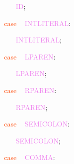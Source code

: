 \documentclass[8, usernames, dvipsnames]{beamer}
\begin{document}
\begin{frame}
\textcolor{White}{\   }
\textcolor{White}{\   }
\textcolor{White}{\   }
\textcolor{OrangeRed}{	}
\textcolor{White}{\ }
\textcolor{Violet}{ID}\textcolor{Sepia}{;}

 \textcolor{White}{\   }
\textcolor{White}{\   }
\textcolor{OrangeRed}{case}
\textcolor{White}{\ }
\textcolor{Violet}{INTLITERAL}\textcolor{Sepia}{:}

 \textcolor{White}{\   }
\textcolor{White}{\   }
\textcolor{White}{\   }
\textcolor{OrangeRed}{	}
\textcolor{White}{\ }
\textcolor{Violet}{INTLITERAL}\textcolor{Sepia}{;}

 \textcolor{White}{\   }
\textcolor{White}{\   }
\textcolor{OrangeRed}{case}
\textcolor{White}{\ }
\textcolor{Violet}{LPAREN}\textcolor{Sepia}{:}

 \textcolor{White}{\   }
\textcolor{White}{\   }
\textcolor{White}{\   }
\textcolor{OrangeRed}{	}
\textcolor{White}{\ }
\textcolor{Violet}{LPAREN}\textcolor{Sepia}{;}

 \textcolor{White}{\   }
\textcolor{White}{\   }
\textcolor{OrangeRed}{case}
\textcolor{White}{\ }
\textcolor{Violet}{RPAREN}\textcolor{Sepia}{:}

 \textcolor{White}{\   }
\textcolor{White}{\   }
\textcolor{White}{\   }
\textcolor{OrangeRed}{	}
\textcolor{White}{\ }
\textcolor{Violet}{RPAREN}\textcolor{Sepia}{;}

 \textcolor{White}{\   }
\textcolor{White}{\   }
\textcolor{OrangeRed}{case}
\textcolor{White}{\ }
\textcolor{Violet}{SEMICOLON}\textcolor{Sepia}{:}

 \textcolor{White}{\   }
\textcolor{White}{\   }
\textcolor{White}{\   }
\textcolor{OrangeRed}{	}
\textcolor{White}{\ }
\textcolor{Violet}{SEMICOLON}\textcolor{Sepia}{;}

 \textcolor{White}{\   }
\textcolor{White}{\   }
\textcolor{OrangeRed}{case}
\textcolor{White}{\ }
\textcolor{Violet}{COMMA}\textcolor{Sepia}{:}

 \end{frame}
\end{document}
